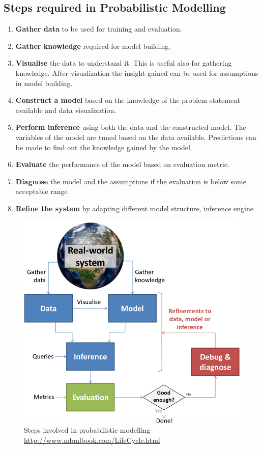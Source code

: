 \subsection*{Steps required in Probabilistic Modelling}
\label{sub:steps}
\begin{enumerate}
	\item \textbf{Gather data} to be used for training and evaluation.
    \item \textbf{Gather knowledge} required for model building.
    \item \textbf{Visualise} the data to understand it. This is useful also for gathering knowledge. After visualization the insight gained can be used for assumptions in model building.
    \item \textbf{Construct a model} based on the knowledge of the problem statement available and data visualization. 
    \item \textbf{Perform inference} using both the data and the constructed model. The variables of the model are tuned based on the data available. Predictions can be made to find out the knowledge gained by the model.
    \item \textbf{Evaluate} the performance of the model based on evaluation metric.
    \item \textbf{Diagnose} the model and the assumptions if the evaluation is below some acceptable range
    \item \textbf{Refine the system} by adapting different model structure, inference engine

\end{enumerate}


\begin{figure}[htp]
\centering
\includegraphics[scale=0.5]{pictures/Lifecycle.png}
\caption{Steps involved in probabilistic modelling  \url{ http://www.mbmlbook.com/LifeCycle.html}}
\label{}
\end{figure}




